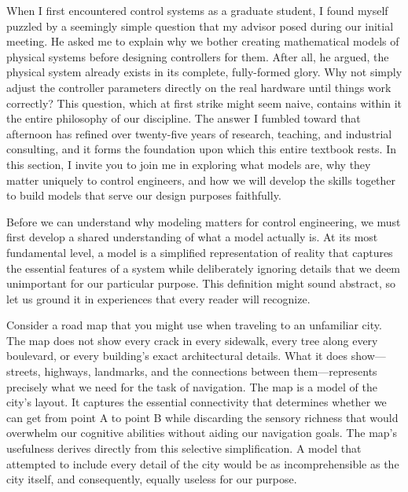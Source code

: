 

When I first encountered control systems as a graduate student, I found myself puzzled by a seemingly simple question that my advisor posed during our initial meeting. He asked me to explain why we bother creating mathematical models of physical systems before designing controllers for them. After all, he argued, the physical system already exists in its complete, fully-formed glory. Why not simply adjust the controller parameters directly on the real hardware until things work correctly? This question, which at first strike might seem naive, contains within it the entire philosophy of our discipline. The answer I fumbled toward that afternoon has refined over twenty-five years of research, teaching, and industrial consulting, and it forms the foundation upon which this entire textbook rests. In this section, I invite you to join me in exploring what models are, why they matter uniquely to control engineers, and how we will develop the skills together to build models that serve our design purposes faithfully.


Before we can understand why modeling matters for control engineering, we must first develop a shared understanding of what a model actually is. At its most fundamental level, a model is a simplified representation of reality that captures the essential features of a system while deliberately ignoring details that we deem unimportant for our particular purpose. This definition might sound abstract, so let us ground it in experiences that every reader will recognize.

Consider a road map that you might use when traveling to an unfamiliar city. The map does not show every crack in every sidewalk, every tree along every boulevard, or every building's exact architectural details. What it does show---streets, highways, landmarks, and the connections between them---represents precisely what we need for the task of navigation. The map is a model of the city's layout. It captures the essential connectivity that determines whether we can get from point A to point B while discarding the sensory richness that would overwhelm our cognitive abilities without aiding our navigation goals. The map's usefulness derives directly from this selective simplification. A model that attempted to include every detail of the city would be as incomprehensible as the city itself, and consequently, equally useless for our purpose.


